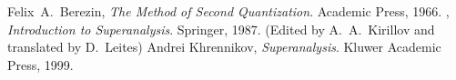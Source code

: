\begin{thebibliography}{99}

Felix~A.~Berezin,
\textit{The Method of Second Quantization}.
Academic Press, 1966.
\bysame, %
\textit{Introduction to Superanalysis}.
Springer, 1987.\newline
(Edited by A.~A.~Kirillov and translated by D.~Leites)
Andrei Khrennikov,
 \emph{Superanalysis}.
Kluwer Academic Press, 1999.
\end{thebibliography}

